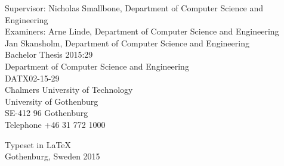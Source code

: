 Supervisor: Nicholas Smallbone, Department of Computer Science and Engineering\\
Examiners: Arne Linde, Department of Computer Science and Engineering\\
Jan Skansholm, Department of Computer Science and Engineering\\[0.5cm]

Bachelor Thesis 2015:29\\
Department of Computer Science and Engineering\\
DATX02-15-29\\
Chalmers University of Technology\\
University of Gothenburg\\
SE-412 96 Gothenburg\\
Telephone +46 31 772 1000\\

\vfill

Typeset in \LaTeX \\
Gothenburg, Sweden 2015
